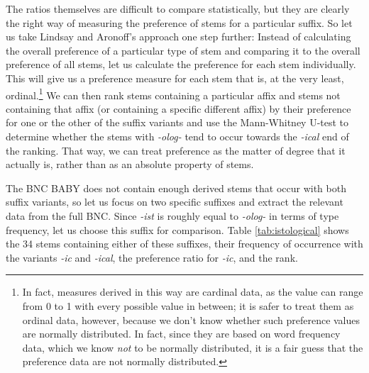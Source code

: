The ratios themselves are difficult to compare statistically, but they are clearly the right way of measuring the preference of stems for a particular suffix. So let us take Lindsay and Aronoff's approach one step further: Instead of calculating the overall preference of a particular type of stem and comparing it to the overall preference of all stems, let us calculate the preference for each stem individually. This will give us a preference measure for each stem that is, at the very least, ordinal.\footnote{In fact, measures derived in this way are cardinal data, as the value can range from 0 to 1 with every possible value in between; it is safer to treat them as ordinal data, however, because we don't know whether such preference values are normally distributed. In fact, since they are based on word frequency data, which we know \textit{not} to be normally distributed, it is a fair guess that the preference data are not normally distributed.} We can then rank stems containing a particular affix and stems not containing that affix (or containing a specific different affix) by their preference for one or the other of the suffix variants and use the Mann-Whitney U-test to determine whether the stems with \textit{-olog-} tend to occur towards the \textit{-ical} end of the ranking. That way, we can treat preference as the matter of degree that it actually is, rather than as an absolute property of stems.

The BNC BABY does not contain enough derived stems that occur with both suffix variants, so let us focus on two specific suffixes and extract the relevant data from the full BNC. Since \textit{-ist} is roughly equal to \textit{-olog-} in terms of type frequency, let us choose this suffix for comparison. Table \ref{tab:istological} shows the 34 stems containing either of these suffixes, their frequency of occurrence with the variants \textit{-ic} and \textit{-ical}, the preference ratio for \textit{-ic}, and the rank.

